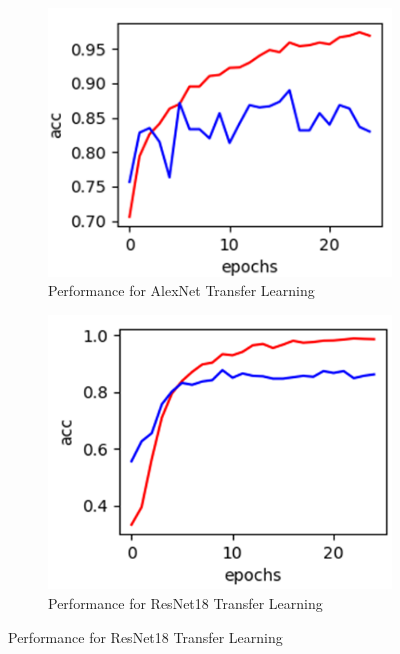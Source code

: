 \documentclass[../main.tex]{subfiles}
\begin{document}
\begin{figure}[h!]
  \centering
  \begin{subfigure}[b]{0.35\linewidth}
    \includegraphics[width=\linewidth]{alexnet.png}
    \caption{Performance for AlexNet Transfer Learning}
  \end{subfigure}
  \begin{subfigure}[b]{0.35\linewidth}
    \includegraphics[width=\linewidth]{resnet18.png}
    \caption{Performance for ResNet18 Transfer Learning}
  \end{subfigure}
  \label{fig:Pre-Trained-Performance}
\end{figure}
\end{document}
